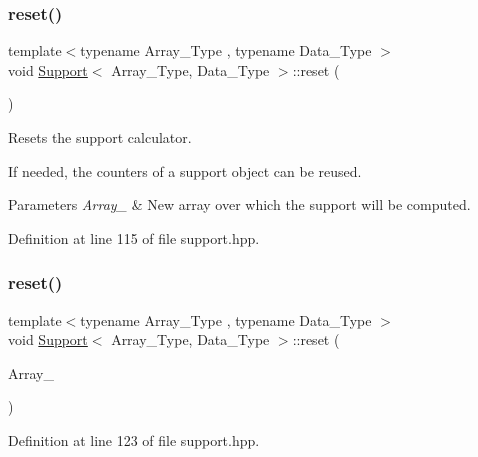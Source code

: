 \subsubsection{\texorpdfstring{reset()}{reset()}\hspace{0.1cm}{\footnotesize\ttfamily [1/2]}}
{\footnotesize\ttfamily template$<$typename Array\+\_\+\+Type , typename Data\+\_\+\+Type $>$ \\
void \hyperlink{class_support}{Support}$<$ Array\+\_\+\+Type, Data\+\_\+\+Type $>$\+::reset (\begin{DoxyParamCaption}{ }\end{DoxyParamCaption})\hspace{0.3cm}{\ttfamily [inline]}}



Resets the support calculator. 

If needed, the counters of a support object can be reused.


\begin{DoxyParams}{Parameters}
{\em Array\+\_\+} & New array over which the support will be computed. \\
\hline
\end{DoxyParams}


Definition at line 115 of file support.\+hpp.

\mbox{\label{class_support_afbe207cc2762bc698c9ccb3212e9de78}} 
\subsubsection{\texorpdfstring{reset()}{reset()}\hspace{0.1cm}{\footnotesize\ttfamily [2/2]}}
{\footnotesize\ttfamily template$<$typename Array\+\_\+\+Type , typename Data\+\_\+\+Type $>$ \\
void \hyperlink{class_support}{Support}$<$ Array\+\_\+\+Type, Data\+\_\+\+Type $>$\+::reset (\begin{DoxyParamCaption}\item[{const Array\+\_\+\+Type $\ast$}]{Array\+\_\+ }\end{DoxyParamCaption})\hspace{0.3cm}{\ttfamily [inline]}}



Definition at line 123 of file support.\+hpp.

\mbox{\label{class_support_a07f225ee54158980ededaccc47abad4c}} 
